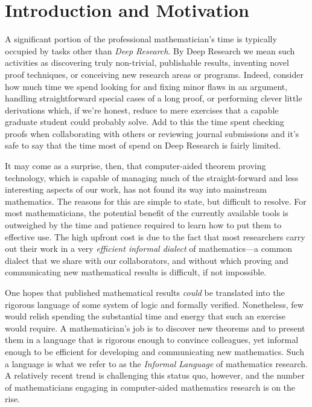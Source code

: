 \documentclass[11pt]{amsart}  %
\begin{document}
\clearpage

\section{Introduction and Motivation}
A significant portion of the professional mathematician's time is typically occupied by tasks other than \textit{Deep Research}. By Deep Research we mean such activities as discovering truly non-trivial, publishable results, inventing novel proof techniques, or conceiving new research areas or programs. Indeed, consider how much time we spend looking for and fixing minor flaws in an argument, handling straightforward special cases of a long proof, or performing clever little derivations which, if we're honest, reduce to mere exercises that a capable graduate student could probably solve.  Add to this the time spent checking proofs when collaborating with others or reviewing journal submissions and it's safe to say that the time most of spend on Deep Research is fairly limited.

It may come as a surprise, then, that computer-aided theorem proving technology,
which is capable of managing much of the straight-forward and less interesting aspects of our work, has not found its way into mainstream mathematics. The reasons for this are simple to state, but difficult to resolve. For most mathematicians, the potential benefit of the currently available tools is outweighed by the time and patience required to learn how to put them to effective use.  The high upfront cost is due to the fact that most researchers carry out their work in a very \emph{efficient informal dialect} of mathematics---a common dialect that we share with our collaborators, and without which proving and communicating new mathematical results is difficult, if not impossible.

One hopes that published mathematical results \emph{could} be translated into  the rigorous language of some system of logic and formally verified. Nonetheless, few would relish spending the substantial time and energy that such an exercise would require. A mathematician's job is to discover new theorems and to present them in a language that is rigorous enough to convince colleagues, yet informal enough to be efficient for developing and communicating new mathematics. Such a language is what we refer to as the \emph{Informal Language} of mathematics research. A relatively recent trend is challenging this status quo, however, and the number of mathematicians engaging in computer-aided mathematics research is on the rise. 
\end{document}
